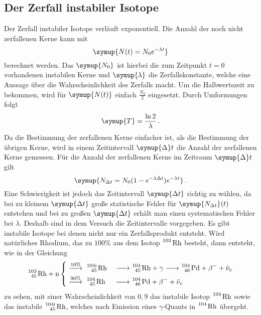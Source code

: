 \subsection{Der Zerfall instabiler Isotope}
Der Zerfall instabiler Isotope verläuft exponentiell. Die Anzahl der noch nicht zerfallenen Kerne kann mit 
\begin{equation}
    \symup{N(t)=N_0 e^{- \lambda t}}
    \label{eqn:isotope}
\end{equation}
berechnet werden. Das $\symup{N_0}$ ist hierbei die zum Zeitpunkt $t=0$ vorhandenen instabilen Kerne und $\symup{\lambda}$ die Zerfallskonstante, welche eine Aussage über die Wahrscheinlichkeit des Zerfalls macht.
Um die Halbwertszeit zu bekommen, wird für $\symup{N(t)}$ einfach $\frac{N_0}{2}$ eingesetzt. Durch Umformungen folgt
\begin{equation}
    \symup{T}=\frac{\ln{2}}{\lambda} \, .
    \label{eqn:halbw}
\end{equation}
Da die Bestimmung der zerfallenen Kerne einfacher ist, als die Bestimmung der übrigen Kerne, wird in einem Zeitintervall $\symup{\Delta}t$
die Anzahl der zerfallenen Kerne gemessen. Für die Anzahl der zerfallenen Kerne im Zeitraum $\symup{\Delta}t$ gilt
\begin{equation}
    \symup{N_{\Delta t}=N_0(1-e^{-\lambda \Delta t})e^{-\lambda t}} \, .
\end{equation}
Eine Schwierigkeit ist jedoch das Zeitintervall $\symup{\Delta t}$ richtig zu wählen, da
bei zu kleinem $\symup{\Delta t}$ große statistische Fehler für $\symup{N_{\Delta t}}(t)$ entstehen 
und bei zu großen $\symup{\Delta t}$ erhält man einen systematischen Fehler bei $\lambda$. 
Deshalb sind in dem Versuch die Zeitintervalle vorgegeben. 
Es gibt instabile Isotope bei denen nicht nur ein Zerfallsprodukt entsteht.
Wird natürliches Rhodium, das zu $100\%$ aus dem Isotop $\ce{^103 Rh}$ besteht, dann entsteht, wie in der Gleichung
\begin{equation}
   \ce{^103_45 Rh + n } 
    \begin{dcases}
        \stackrel{10\%}{\ce{->}}\ce{ ^{104\text{i}}_45 Rh &-> ^104_45 Rh + $\gamma$ -> ^104_46 Pd + $\beta$- + $\bar{\nu}_e$}  \\
        \stackrel{90\%}{\ce{->}}\ce{ ^104_45 Rh  &-> ^104_46 Pd + $\beta$- + $\bar{\nu}_e$} 
    \end{dcases}
\end{equation}
zu sehen, mit einer Wahrscheinlichkeit von $0,9$ das instabile Isotop $\ce{^104 Rh}$ sowie das instabile $\ce{^{104\text{i}}_45 Rh}$, welches nach Emission eines $\gamma$-Quants in $\ce{^104 Rh}$ übergeht.
